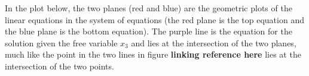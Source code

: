 \documentclass[
]{book}
\newenvironment{Shaded}{\begin{snugshade}}{\end{snugshade}}
\newcommand{\CommentTok}[1]{\textcolor[rgb]{0.56,0.35,0.01}{\textit{#1}}}
\newcommand{\DataTypeTok}[1]{\textcolor[rgb]{0.13,0.29,0.53}{#1}}
\newcommand{\DecValTok}[1]{\textcolor[rgb]{0.00,0.00,0.81}{#1}}
\newcommand{\KeywordTok}[1]{\textcolor[rgb]{0.13,0.29,0.53}{\textbf{#1}}}
\newcommand{\NormalTok}[1]{#1}
\newcommand{\OperatorTok}[1]{\textcolor[rgb]{0.81,0.36,0.00}{\textbf{#1}}}
\newcommand{\StringTok}[1]{\textcolor[rgb]{0.31,0.60,0.02}{#1}}
\theoremstyle{definition}
\theoremstyle{definition}
\theoremstyle{definition}
\theoremstyle{remark}
\begin{document}
In the plot below, the two planes (red and blue) are the geometric plots of the linear equations in the system of equations (the red plane is the top equation and the blue plane is the bottom equation). The purple line is the equation for the solution given the free variable \(x_3\) and lies at the intersection of the two planes, much like the point in the two lines in figure \textbf{linking reference here} lies at the intersection of the two points.

\begin{Shaded}
\end{Shaded}
\end{document}
